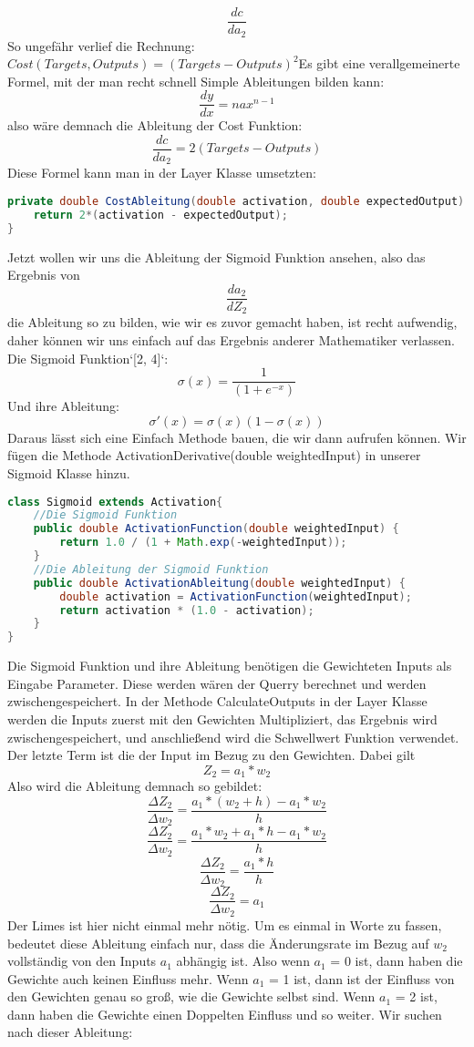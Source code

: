 \documentclass[12pt]{article}
\begin{document}
$$\frac{ dc }{ da_{ 2 } }$$
So ungefähr verlief die Rechnung:
$Cost(Targets, Outputs) = (Targets - Outputs)^2$Es gibt eine verallgemeinerte Formel, mit der man recht schnell Simple Ableitungen bilden kann:
$$\frac{dy}{dx}=nax^{n-1}$$
also wäre demnach die Ableitung der Cost Funktion:
$$\frac{dc}{da_2}=2(Targets-Outputs)$$
Diese Formel kann man in der Layer Klasse umsetzten:\begin{lstlisting}[language=Java]
private double CostAbleitung(double activation, double expectedOutput) {
    return 2*(activation - expectedOutput);
}
\end{lstlisting}Jetzt wollen wir uns die Ableitung der Sigmoid Funktion ansehen, also das Ergebnis von
$$\frac{da_2}{dZ_2}$$
die Ableitung so zu bilden, wie wir es zuvor gemacht haben, ist recht aufwendig, daher können wir uns einfach auf das Ergebnis anderer Mathematiker verlassen.
Die Sigmoid Funktion`[2, 4]`:
$$\sigma (x)=\frac{1}{(1+e^{-x})}$$
Und ihre Ableitung:
$$\sigma '(x)=\sigma (x)(1-\sigma(x))$$
Daraus lässt sich eine Einfach Methode bauen, die wir dann aufrufen können. Wir fügen die Methode ActivationDerivative(double weightedInput) in unserer Sigmoid Klasse hinzu.\begin{lstlisting}[language=Java]
class Sigmoid extends Activation{
    //Die Sigmoid Funktion
    public double ActivationFunction(double weightedInput) {
        return 1.0 / (1 + Math.exp(-weightedInput));
    }
    //Die Ableitung der Sigmoid Funktion
    public double ActivationAbleitung(double weightedInput) {
        double activation = ActivationFunction(weightedInput);
        return activation * (1.0 - activation);
    }
}
\end{lstlisting}Die Sigmoid Funktion und ihre Ableitung benötigen die Gewichteten Inputs als Eingabe Parameter. Diese werden wären der Querry berechnet und werden zwischengespeichert. In der Methode CalculateOutputs in der Layer Klasse werden die Inputs zuerst mit den Gewichten Multipliziert, das Ergebnis wird zwischengespeichert, und anschließend wird die Schwellwert Funktion verwendet. Der letzte Term ist die der Input im Bezug zu den Gewichten.
Dabei gilt 
$$Z_2 = a_1*w_2$$
Also wird die Ableitung demnach so gebildet:
$$\frac{\Delta Z_2}{\Delta w_2}=\frac{a_1*(w_2+h)-a_1*w_2}{h}$$
$$\frac{\Delta Z_2}{\Delta w_2}=\frac{a_1*w_2+a_1*h-a_1*w_2}{h}$$
$$\frac{\Delta Z_2}{\Delta w_2}=\frac{a_1*h}{h}$$
$$\frac{\Delta Z_2}{\Delta w_2}=a_1$$
Der Limes ist hier nicht einmal mehr nötig. Um es einmal in Worte zu fassen, bedeutet diese Ableitung einfach nur, dass die Änderungsrate im Bezug auf $w_2$ vollständig von den Inputs $a_1$ abhängig ist. Also wenn $a_1$ = 0 ist, dann haben die Gewichte auch keinen Einfluss mehr. Wenn $a_1$ = 1 ist, dann ist der Einfluss von den Gewichten genau so groß, wie die Gewichte selbst sind. Wenn $a_1$ = 2 ist, dann haben die Gewichte einen Doppelten Einfluss und so weiter. Wir suchen nach dieser Ableitung:
\end{document}
